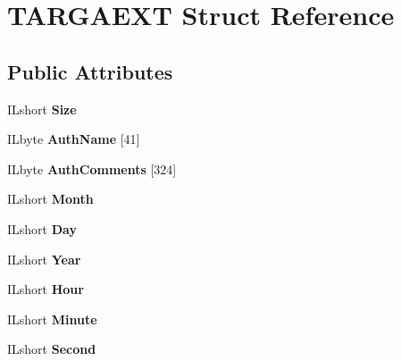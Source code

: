\hypertarget{structTARGAEXT}{}\section{T\+A\+R\+G\+A\+E\+XT Struct Reference}
\label{structTARGAEXT}
\subsection*{Public Attributes}
\begin{DoxyCompactItemize}
\item 
\mbox{\label{structTARGAEXT_abd2bb5a7a7ff7ce6ff94ec8af3d31521}} 
I\+Lshort {\bfseries Size}
\item 
\mbox{\label{structTARGAEXT_a995204ec8e9ce369533c0d223aae631e}} 
I\+Lbyte {\bfseries Auth\+Name} \mbox{[}41\mbox{]}
\item 
\mbox{\label{structTARGAEXT_a2a71c20958c2f1c811cd52a558d69afc}} 
I\+Lbyte {\bfseries Auth\+Comments} \mbox{[}324\mbox{]}
\item 
\mbox{\label{structTARGAEXT_aca044002c6c26180c552f6559d310771}} 
I\+Lshort {\bfseries Month}
\item 
\mbox{\label{structTARGAEXT_a352fe34bacfa486f52bb1cacc6bf7357}} 
I\+Lshort {\bfseries Day}
\item 
\mbox{\label{structTARGAEXT_a6a78482d7104954ca5c767f8eca7899e}} 
I\+Lshort {\bfseries Year}
\item 
\mbox{\label{structTARGAEXT_a17bb996787f0ad519da9b24a7422aa05}} 
I\+Lshort {\bfseries Hour}
\item 
\mbox{\label{structTARGAEXT_a5ac01bdd377f801ae6b5bcddafc8b3fb}} 
I\+Lshort {\bfseries Minute}
\item 
\mbox{\label{structTARGAEXT_a6116b3817b50540c7eb60a247fe66846}} 
I\+Lshort {\bfseries Second}
\item 
\mbox{\label{structTARGAEXT_a79b1fff9e9a70acd91c93c1bf12dd351}} 

\end{DoxyCompactItemize}
